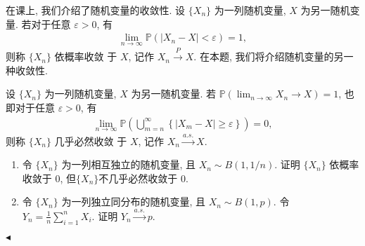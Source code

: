 \documentclass[11pt]{article}
\newenvironment{problem}[2][Problem]{\begin{trivlist}
    \item[\hskip \labelsep {\bfseries #1}\hskip \labelsep {\bfseries #2.}]\songti}{\hfill$\blacktriangleleft$\end{trivlist}}
\newcommand\1{\mathds{1}}
\newcommand\PP{\mathbb{P}}
\newcommand{\arrp}{\xrightarrow{P}}
\newcommand{\arras}{\xrightarrow{a.s.}}
\begin{document}
\begin{problem}{2}
    在课上, 我们介绍了随机变量的收敛性. 设 $\{X_n\}$ 为一列随机变量, $X$ 为另一随机变量. 若对于任意 $\varepsilon > 0$, 有
    \begin{align*}
        \lim_{n\rightarrow\infty} \PP(|X_n-X|<\varepsilon) = 1,
    \end{align*}
    则称 $\{X_n\}$ {\kaishu 依概率收敛} 于 $X$, 记作 $X_n \arrp X$. 在本题, 我们将介绍随机变量的另一种收敛性.

    设 $\{X_n\}$ 为一列随机变量, $X$ 为另一随机变量. 若 $\PP(\lim_{n\rightarrow \infty}X_n \to X) = 1$, 也即对于任意 $\varepsilon > 0$, 有
    \begin{align*}
        \lim_{n\rightarrow\infty} \PP\left(\bigcup_{m=n}^\infty \left\{ |X_m - X| \ge \varepsilon \right\}\right) = 0,
    \end{align*}
    则称 $\{X_n\}$ {\kaishu 几乎必然收敛} 于 $X$, 记作 $X_n \arras X$.
    \begin{enumerate}[label=(\arabic*)]
        \item 令 $\{X_n\}$ 为一列相互独立的随机变量, 且 $X_n \sim B(1,1/n)$. 证明 $\{X_n\}$ 依概率收敛于 $0$, 但$\{X_n\}$不几乎必然收敛于 $0$.
        \item 令 $\{X_n\}$ 为一列独立同分布的随机变量, 且 $X_n \sim B(1, p)$. 令 $Y_n = \frac{1}{n} \sum_{i=1}^n X_i$. 证明 $Y_n \arras p$.
    \end{enumerate}
\end{problem}
\end{document}
